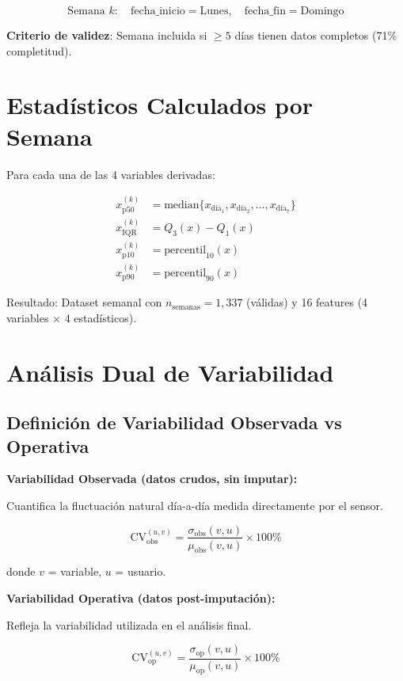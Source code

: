 \documentclass[12pt,letterpaper,twoside]{report}
\begin{document}
\begin{equation}
\text{Semana } k: \quad \text{fecha\_inicio} = \text{Lunes}, \quad \text{fecha\_fin} = \text{Domingo}
\end{equation}

\textbf{Criterio de validez}: Semana incluida si $\geq 5$ días tienen datos completos (71\% completitud).

\section{Estadísticos Calculados por Semana}

Para cada una de las 4 variables derivadas:

\begin{align}
x^{(k)}_{\text{p50}} &= \text{median}\{x_{\text{día}_1}, x_{\text{día}_2}, \ldots, x_{\text{día}_7}\} \\
x^{(k)}_{\text{IQR}} &= Q_3(x) - Q_1(x) \\
x^{(k)}_{\text{p10}} &= \text{percentil}_{10}(x) \\
x^{(k)}_{\text{p90}} &= \text{percentil}_{90}(x)
\end{align}

Resultado: Dataset semanal con $n_{\text{semanas}}=1,337$ (válidas) y 16 features (4 variables $\times$ 4 estadísticos).

\section{Análisis Dual de Variabilidad}

\subsection{Definición de Variabilidad Observada vs Operativa}

\begin{estadisticobox}
\textbf{Variabilidad Observada (datos crudos, sin imputar):}

Cuantifica la fluctuación natural día-a-día medida directamente por el sensor.

\begin{equation}
\text{CV}_{\text{obs}}^{(u,v)} = \frac{\sigma_{\text{obs}}(v, u)}{\mu_{\text{obs}}(v, u)} \times 100\%
\end{equation}

donde $v$ = variable, $u$ = usuario.

\textbf{Variabilidad Operativa (datos post-imputación):}

Refleja la variabilidad utilizada en el análisis final.

\begin{equation}
\text{CV}_{\text{op}}^{(u,v)} = \frac{\sigma_{\text{op}}(v, u)}{\mu_{\text{op}}(v, u)} \times 100\%
\end{equation}
\end{estadisticobox}
\end{document}
